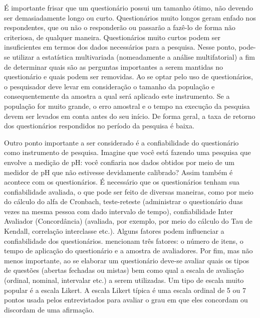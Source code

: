 É importante frisar que um questionário possui um tamanho ótimo, não devendo ser demasiadamente longo ou curto. Questionários muito longos geram enfado nos respondentes, que ou não o responderão ou passarão a fazê-lo de forma não criteriosa, de qualquer maneira. Questionários muito curtos podem ser insuficientes em termos dos dados necessários para a pesquisa. Nesse ponto, pode-se utilizar a estatística multivariada (nomeadamente a análise multifatorial) a fim de determinar quais são as perguntas importantes a serem mantidas no questionário e quais podem ser removidas.
Ao se optar pelo uso de questionários, o pesquisador deve levar em consideração o tamanho da população e consequentemente da amostra a qual será aplicado este instrumento. Se a população for muito grande, o erro amostral e o tempo na execução da pesquisa devem ser levados em conta antes do seu início. De forma geral, a taxa de retorno dos questionários respondidos no período da pesquisa é baixa.

Outro ponto importante a ser considerado é a confiabilidade do questionário como instrumento de pesquisa. Imagine que você está fazendo uma pesquisa que envolve a medição de pH: você confiaria nos dados obtidos por meio de um medidor de pH que não estivesse devidamente calibrado? Assim também é acontece com os questionários. É necessário que os questionários tenham sua confiabilidade avaliada, o que pode ser feito de diversas maneiras, como por meio do cálculo do alfa de Cronbach, teste-reteste (administrar o questionário duas vezes na mesma pessoa com dado intervalo de tempo), confiabilidade Inter Avaliador (Concordância) (avaliada, por exemplo, por meio do cálculo do Tau de Kendall, correlação interclasse etc.). Alguns fatores podem influenciar a confiabilidade dos questionários.  mencionam três fatores: o número de itens, o tempo de aplicação do questionário e a amostra de avaliadores. 
Por fim, mas não menos importante, ao se elaborar um questionário deve-se avaliar quais os tipos de questões (abertas fechadas ou mistas) bem como qual a escala de avaliação (ordinal, nominal, intervalar etc.) a serem utilizadas. Um tipo de escala muito popular é a escala Likert. A escala Likert típica é uma escala ordinal de 5 ou 7 pontos usada pelos entrevistados para avaliar o grau em que eles concordam ou discordam de uma afirmação.
